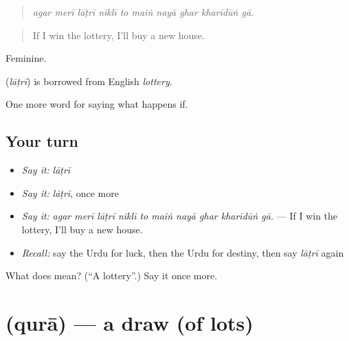 \begin{quote}
         
\end{quote}

\begin{quote}
\emph{agar merī lāṭrī niklī to maiṅ nayā ghar kharīdūṅ gā.}
\end{quote}

\begin{quote}
If I win the lottery, I'll buy a new house.
\end{quote}

Feminine.

\begin{cousinweb}
\textbf{} (\emph{lāṭrī}) is borrowed from English \emph{lottery}.
\end{cousinweb}

\begin{grammarlens}[title={What you've built}]
One more word for saying what happens if.
\end{grammarlens}

\subsection*{Your turn}
\begin{itemize}
\raggedright
  \item \emph{Say it:} \emph{lāṭrī}
  \item \emph{Say it:} \emph{lāṭrī}, once more
  \item \emph{Say it:} \emph{agar merī lāṭrī niklī to maiṅ nayā ghar kharīdūṅ gā.} — If I win the lottery, I'll buy a new house.
  \item \emph{Recall:} say the Urdu for luck, then the Urdu for destiny, then say \emph{lāṭrī} again
\end{itemize}

\begin{tcolorbox}[breakable,colback=teal!4,colframe=teal!35!black,title={Before you move on}]
What does  mean? (\textquotedblleft{}A lottery\textquotedblright{}.) Say it once more.
\end{tcolorbox}
\section[\texorpdfstring{\ur{قرعہ} (qurā)}{قرعہ (qurā)}]{ (qurā) — a draw (of lots)}

\label{lesson:UR-C532-qura}



